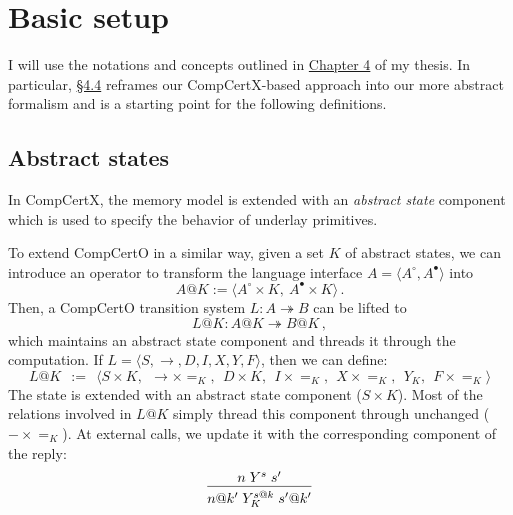 \documentclass{article}
\begin{document}


\section{Basic setup} %

I will use the notations and concepts outlined in
\href{https://certikos.github.io/rbgs-papers/thesis/thesis.pdf\#chapter.4}{Chapter 4}
of my thesis.
In particular,
\href{https://certikos.github.io/rbgs-papers/thesis/thesis.pdf#section.4.4}{\S 4.4}
reframes our CompCertX-based approach
into our more abstract formalism
and is a starting point for the following definitions.

\subsection{Abstract states} %

In CompCertX,
the memory model is extended with an \emph{abstract state} component
which is used to specify the behavior of underlay primitives.

To extend CompCertO in a similar way,
given a set $K$ of abstract states,
we can introduce an operator to transform the language interface
$A = \langle A^\circ, A^\bullet \rangle$
into
\[
    A@K := \langle A^\circ \times K, \: A^\bullet \times K \rangle
    \,.
\]
Then,
a CompCertO transition system $L : A \twoheadrightarrow B$
can be lifted to \[ L@K : A@K \twoheadrightarrow B@K \,, \]
which maintains an abstract state component
and threads it through the computation.
If $L = \langle S, {\rightarrow}, D, I, X, Y, F \rangle$,
then we can define:
\[
    L@K \:\: := \:\:
      \langle S \times K, \:\: {\rightarrow} \times {=}_K, \:\:
            D \times K, \:\: I \times {=}_K, \:\: X \times {=}_K, \:\:
            Y_K, \:\: F \times {=}_K \rangle
\]
The state is extended with an abstract state component ($S \times K$).
Most of the relations involved in $L@K$
simply thread this component through unchanged (${-} \times {=}_K$).
At external calls,
we update it with the
corresponding component of the reply:
\[
  \begin{prooftree}
    \hypo{n \mathrel{Y^s} s'}
    \infer1{n@{k'} \mathrel{Y_K^{s@k}} s'@k'}
  \end{prooftree} 
\]
\end{document}

